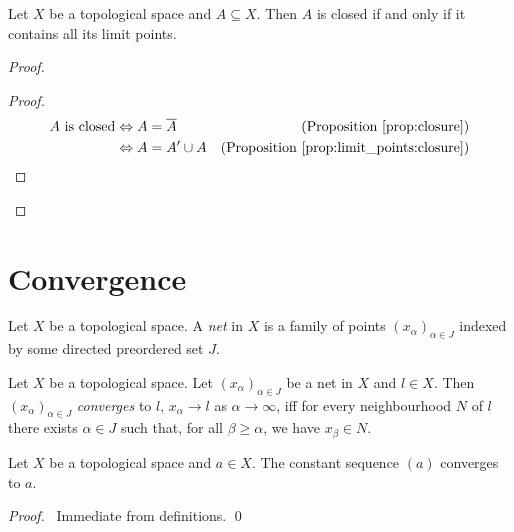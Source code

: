 \begin{cor}
\label{cor:limit_points:closed}
  Let $X$ be a topological space and $A \subseteq X$. Then $A$ is closed if and only if it contains all its limit points.
\end{cor}

\begin{proof}
  \pf
  \begin{proof}
    \pf
    \begin{align*}
      A \text{ is closed} & \Leftrightarrow A = \overline{A} & (\text{Proposition \ref{prop:closure}}) \\
      & \Leftrightarrow A = A' \cup A & (\text{Proposition \ref{prop:limit_points:closure}})
    \end{align*}
  \end{proof}
\end{proof}

\section{Convergence}

\begin{df}[Net]
 Let $X$ be a topological space. A \emph{net} in $X$ is a family of points 
$(x_\alpha)_{\alpha \in J}$ indexed by some directed preordered set $J$.
\end{df}

\begin{df}[Convergence]
  Let $X$ be a topological space. 
  Let $(x_\alpha)_{\alpha \in J}$ be a net in $X$ and $l \in X$. Then 
$(x_\alpha)_{\alpha \in J}$ \emph{converges} to $l$, $x_\alpha \rightarrow l$ 
as $\alpha \rightarrow \infty$, iff for every neighbourhood $N$ of $l$ there 
exists $\alpha \in J$ such that, for all $\beta \geq \alpha$, we have $x_\beta 
\in N$.
\end{df}

\begin{prop}
\label{prop:topology:converge_constant}
 Let $X$ be a topological space and $a \in X$. The constant sequence $(a)$ 
converges to $a$.
\end{prop}

\begin{proof}
 \pf\ Immediate from definitions. \qed
\end{proof}

